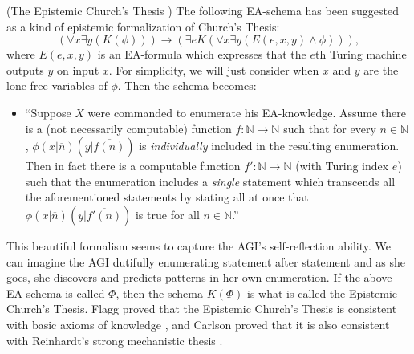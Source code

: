 \documentclass[runningheads]{llncs}
\begin{document}
\begin{example}
\label{ectexample}
  (The Epistemic Church's Thesis \cite{flagg1985church} \cite{carlson2016collapsing})
  The following EA-schema has been suggested as a kind of epistemic formalization
  of Church's Thesis:
  \[
  ( \forall x\exists y (K(\phi))  ) \rightarrow
  ( \exists e K( \forall x\exists y ( E(e,x,y) \wedge \phi  )  )  ),
  \]
  where $E(e,x,y)$ is an EA-formula which expresses that the $e$th Turing machine
  outputs $y$ on input $x$.
  For simplicity, we will just consider when $x$ and $y$ are the lone free variables
  of $\phi$.
  Then the schema becomes:
  \begin{itemize}
    \item
    ``Suppose $X$ were commanded to enumerate his EA-knowledge.
    Assume there is a (not necessarily computable) function
    $f:\mathbb N\to\mathbb N$ such that for every $n\in\mathbb N$,
    $\phi(x|\overline n)(y|\overline{f(n)})$ is \emph{individually}
    included in the resulting enumeration.
    Then in fact there is a computable
    function $f':\mathbb N\to\mathbb N$ (with Turing index $e$)
    such that the enumeration includes
    a \emph{single} statement which transcends all the aforementioned statements
    by stating all at once that $\phi(x|\overline n)(y|\overline{f'(n)})$
    is true for all $n\in\mathbb N$.''
  \end{itemize}
  This beautiful formalism seems to capture the AGI's self-reflection ability.
  We can imagine the AGI dutifully enumerating statement after statement and
  as she goes, she discovers and predicts patterns in her own enumeration.
  If the above EA-schema is called $\Phi$, then the schema $K(\Phi)$ is what is called
  the Epistemic Church's Thesis.
  Flagg proved that the Epistemic Church's Thesis is
  consistent with basic axioms of knowledge \cite{flagg1985church},
  and Carlson proved that it is also consistent with
  Reinhardt's strong mechanistic thesis \cite{carlson2016collapsing}.
\end{example}
\end{document}
